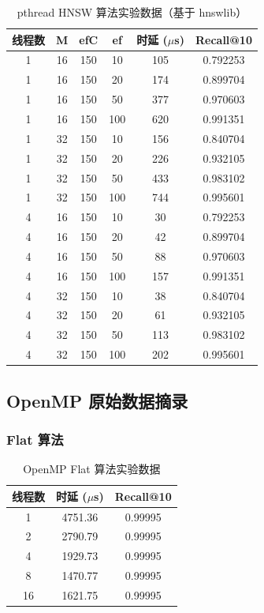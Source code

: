 \documentclass[a4paper]{article}
\begin{document}
\begin{table}[H]
\centering
\caption{pthread HNSW 算法实验数据（基于 hnswlib）}
\begin{tabular}{cccccc}
\toprule
线程数 & M & efC & ef & 时延 ($\mu$s) & Recall@10 \\
\midrule
1 & 16 & 150 & 10 & 105 & 0.792253 \\
1 & 16 & 150 & 20 & 174 & 0.899704 \\
1 & 16 & 150 & 50 & 377 & 0.970603 \\
1 & 16 & 150 & 100 & 620 & 0.991351 \\
1 & 32 & 150 & 10 & 156 & 0.840704 \\
1 & 32 & 150 & 20 & 226 & 0.932105 \\
1 & 32 & 150 & 50 & 433 & 0.983102 \\
1 & 32 & 150 & 100 & 744 & 0.995601 \\
4 & 16 & 150 & 10 & 30 & 0.792253 \\
4 & 16 & 150 & 20 & 42 & 0.899704 \\
4 & 16 & 150 & 50 & 88 & 0.970603 \\
4 & 16 & 150 & 100 & 157 & 0.991351 \\
4 & 32 & 150 & 10 & 38 & 0.840704 \\
4 & 32 & 150 & 20 & 61 & 0.932105 \\
4 & 32 & 150 & 50 & 113 & 0.983102 \\
4 & 32 & 150 & 100 & 202 & 0.995601 \\
\bottomrule
\end{tabular}
\end{table}

\subsection{OpenMP 原始数据摘录}

\subsubsection{Flat 算法}

\begin{table}[H]
\centering
\caption{OpenMP Flat 算法实验数据}
\begin{tabular}{ccc}
\toprule
线程数 & 时延 ($\mu$s) & Recall@10 \\
\midrule
1 & 4751.36 & 0.99995 \\
2 & 2790.79 & 0.99995 \\
4 & 1929.73 & 0.99995 \\
8 & 1470.77 & 0.99995 \\
16 & 1621.75 & 0.99995 \\
\bottomrule
\end{tabular}
\end{table}
\end{document}

